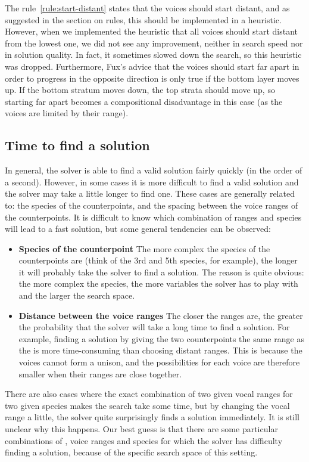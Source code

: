 The rule~\ref{rule:start-distant} states that the voices should start distant, and as suggested in the section on rules, this should be implemented in a heuristic. However, when we implemented the heuristic that all voices should start distant from the lowest one, we did not see any improvement, neither in search speed nor in solution quality. In fact, it sometimes slowed down the search, so this heuristic was dropped. Furthermore, Fux's advice that the voices should start far apart in order to progress in the opposite direction is only true if the bottom layer moves up. If the bottom stratum moves down, the top strata should move up, so starting far apart becomes a compositional disadvantage in this case (as the voices are limited by their range).



\subsection{Time to find a solution} \label{section:time-to-find-a-solution}
In general, the solver is able to find a valid solution fairly quickly (in the order of a second). However, in some cases it is more difficult to find a valid solution and the solver may take a little longer to find one. These cases are generally related to: the species of the counterpoints, and the spacing between the voice ranges of the counterpoints. It is difficult to know which combination of ranges and species will lead to a fast solution, but some general tendencies can be observed:

\begin{itemize}
    \item \textbf{Species of the counterpoint} \textendash{} The more complex the species of the counterpoints are (think of the 3rd and 5th species, for example), the longer it will probably take the solver to find a solution. The reason is quite obvious: the more complex the species, the more variables the solver has to play with and the larger the search space.  
    \item \textbf{Distance between the voice ranges} \textendash{}  The closer the ranges are, the greater the probability that the solver will take a long time to find a solution. For example, finding a solution by giving the two counterpoints the same range as the \cfs is more time-consuming than choosing distant ranges. This is because the voices cannot form a unison, and the possibilities for each voice are therefore smaller when their ranges are close together.
\end{itemize}
There are also cases where the exact combination of two given vocal ranges for two given species makes the search take some time, but by changing the vocal range a little, the solver quite surprisingly finds a solution immediately. It is still unclear why this happens. Our best guess is that there are some particular combinations of \cf, voice ranges and species for which the solver has difficulty finding a solution, because of the specific search space of this setting.

